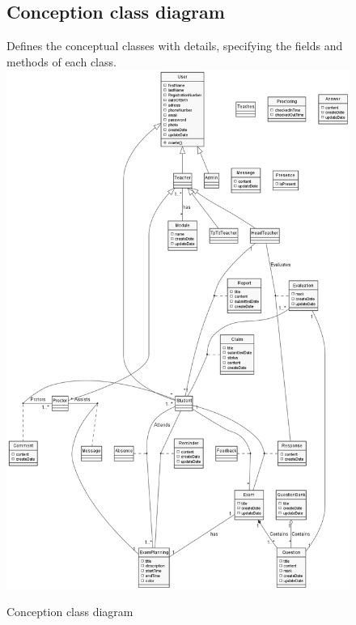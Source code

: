 \documentclass[]{uc2pfecaneva}
\begin{document}
    \begin{figure}
        \subsection{Conception class diagram}
        \raggedright Defines the conceptual classes with details, specifying the fields and methods of each class.
        \linebreak
        \includegraphics[width=\textwidth]{images/CCD}
        \caption{Conception class diagram}
    \end{figure}
    \clearpage
\end{document}
